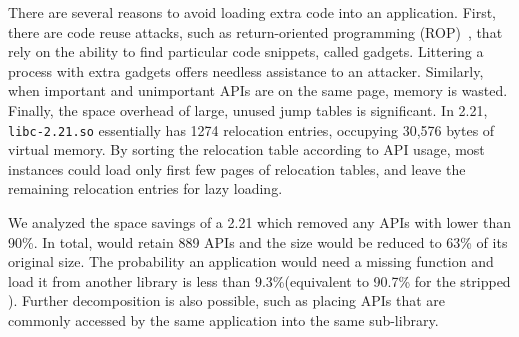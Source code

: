 There are several reasons to avoid loading extra code into an application.
First, there are code reuse attacks, such as return-oriented programming (ROP)~\citep{return-oriented},
that rely on the ability to find particular code snippets, called gadgets.
Littering a process with extra gadgets offers needless assistance to an attacker.
Similarly, when important and unimportant APIs are on the same page,
memory is wasted.  
Finally, the space overhead of large, unused jump tables is significant.
In \glibc{} 2.21, {\tt libc-2.21.so} essentially has 1274 relocation entries, occupying 30,576 bytes of virtual memory. 
By sorting the relocation table according to API usage,
most \libc{} instances could load only first few pages of relocation tables, and leave the remaining relocation entries for lazy loading.

We analyzed the space savings of a 
\glibc{} 2.21 which removed any APIs with \usagemetric{} lower than 90\%.
In total, \libc{} would retain 889 APIs
and the size would be reduced to 63\% of its original size.
The probability an application would need a missing function and load it from another library is less than 9.3\%(equivalent to 90.7\% \compatmetric{} for the stripped \libc{}).
Further decomposition is also possible, 
such as placing APIs
that are commonly accessed by the same application into the same sub-library.




